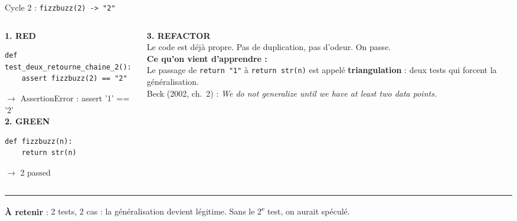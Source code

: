 \documentclass[aspectratio=169,11pt]{beamer}
\newcommand{\takeaway}[1]{%
\vfill\begin{beamercolorbox}[wd=\linewidth,sep=0.4em]{}
\color{accent2}\rule[0.6ex]{1.2em}{1.2pt}\hspace{0.4em}%
\textbf{\color{accent2}\small À retenir} \textcolor{textsoft}{:} %
{\small\color{textmain}#1}
\end{beamercolorbox}}
\begin{document}
\begin{frame}[fragile,t,shrink=15]{Cycle 2 : \texttt{fizzbuzz(2) -> "2"}}
\begin{columns}[T,onlytextwidth]
\begin{column}{0.48\textwidth}
\textbf{\color{bad}1. RED}
\begin{lstlisting}[style=pythondark]
def test_deux_retourne_chaine_2():
    assert fizzbuzz(2) == "2"
\end{lstlisting}
{\color{bad}\scriptsize $\to$ AssertionError : assert '1' == '2'}
\vspace{0.4em}\\
\textbf{\color{good}2. GREEN}
\begin{lstlisting}[style=pythondark]
def fizzbuzz(n):
    return str(n)
\end{lstlisting}
{\color{good}\scriptsize $\to$ 2 passed}
\end{column}
\begin{column}{0.48\textwidth}
\vspace{0.1cm}\textbf{\color{accent}3. REFACTOR}\\[0.2em]
\footnotesize Le code est déjà propre. Pas de duplication, pas d'odeur. On passe.\\[0.4em]
\textbf{Ce qu'on vient d'apprendre :}\\[0.2em]
Le passage de \texttt{return "1"} à \texttt{return str(n)} est appelé \og \textbf{triangulation} \fg{} : deux tests qui forcent la généralisation.\\[0.4em]
{\color{textsoft}Beck (2002, ch.~2) : \og \textit{We do not generalize until we have at least two data points.} \fg{}}
\end{column}
\end{columns}
\takeaway{2 tests, 2 cas : la généralisation devient légitime. Sans le 2\textsuperscript{e} test, on aurait spéculé.}
\end{frame}
\end{document}
